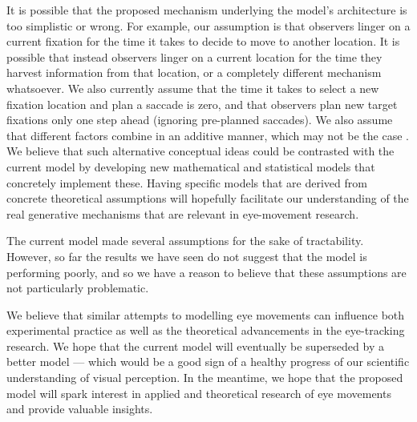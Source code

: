 \documentclass{article}
\begin{document}
It is possible that the proposed mechanism underlying the model's architecture is too simplistic or wrong. For example, our assumption is that observers linger on a current fixation for the time it takes to decide to move to another location. It is possible that instead observers linger on a current location for the time they harvest information from that location, or a completely different mechanism whatsoever. We also currently assume that the time it takes to select a new fixation location and plan a saccade is zero, and that observers plan new target fixations only one step ahead (ignoring pre-planned saccades). We also assume that different factors combine in an additive manner, which may not be the case \citep{barthelme2013spatial}. We believe that such alternative conceptual ideas could be contrasted with the current model by developing new mathematical and statistical models that concretely implement these. Having specific models that are derived from concrete theoretical assumptions will hopefully facilitate our understanding of the real generative mechanisms \citep{borsboom2020theory,schutt2017likelihood} that are relevant in eye-movement research. 

The current model made several assumptions for the sake of tractability. However, so far the results we have seen do not suggest that the model is performing poorly, and so we have a reason to believe that these assumptions are not particularly problematic.

We believe that similar attempts to modelling eye movements can influence both experimental practice as well as the theoretical advancements in the eye-tracking research. We hope that the current model will eventually be superseded by a better model --- which would be a good sign of a healthy progress of our scientific understanding of visual perception. In the meantime, we hope that the proposed model will spark interest in applied and theoretical research of eye movements and provide valuable insights.


\end{document}
